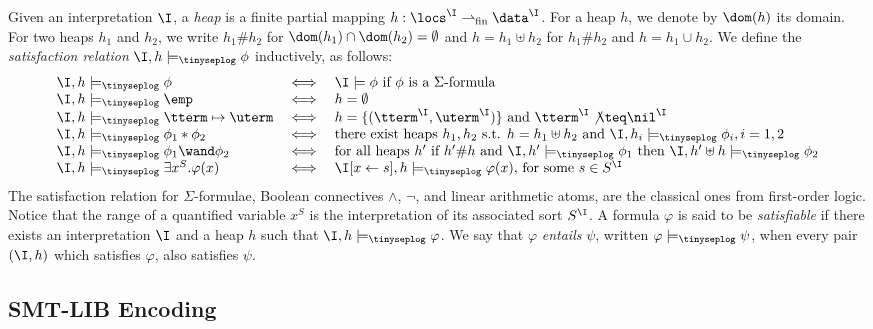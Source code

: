 \documentclass[10pt]{llncs}
\begin{document}
Given an interpretation $\I$, a \emph{heap} is a finite partial
mapping $h : \locs^\I \rightharpoonup_{\mathrm{fin}} \data^\I$. For a
heap $h$, we denote by $\dom(h)$ its domain. For two heaps $h_1$ and
$h_2$, we write $h_1 \# h_2$ for $\dom(h_1) \cap \dom(h_2) =
\emptyset$ and $h = h_1 \uplus h_2$ for $h_1 \# h_2$ and $h = h_1 \cup
h_2$. We define the \emph{satisfaction relation} $\I,h
\models_{\tinyseplog} \phi$ inductively, as follows:
\[\begin{array}{lcl}
\I,h \models_{\tinyseplog} \phi & \iff & \I \models \phi \text{ if $\phi$ is a $\Sigma$-formula} \\
\I,h \models_{\tinyseplog} \emp & \iff & h = \emptyset \\
\I,h \models_{\tinyseplog} \tterm \mapsto \uterm & \iff & 
h = \{(\tterm^\I,\uterm^\I)\} \text{ and } \tterm^\I\not\teq\nil^\I \\
\I,h \models_{\tinyseplog} \phi_1 * \phi_2 & \iff & \text{there exist heaps } h_1,h_2 
\text{ s.t. } h=h_1\uplus h_2 
\text{ and } \I,h_i \models_{\tinyseplog} \phi_i, i = 1,2 \\
\I,h \models_{\tinyseplog} \phi_1 \wand \phi_2 & \iff & \text{for all heaps } h' \text{ if } h'\#h 
\text{ and } \I,h' \models_{\tinyseplog} \phi_1
\text{ then } \I,h'\uplus h \models_{\tinyseplog} \phi_2 \\
\I,h \models_{\tinyseplog} \exists x^S . \varphi(x) & \iff & 
\I[x \leftarrow s],h \models_{\tinyseplog} \varphi(x) \text{, for some }s \in S^\I
\end{array}\]
The satisfaction relation for $\Sigma$-formulae, Boolean connectives
$\wedge$, $\neg$, and linear arithmetic atoms, are the classical ones
from first-order logic. Notice that the range of a quantified variable
$x^S$ is the interpretation of its associated sort $S^\I$. A formula
$\varphi$ is said to be \emph{satisfiable} if there exists an
interpretation $\I$ and a heap $h$ such that $\I,h
\models_{\tinyseplog} \varphi$. We say that $\varphi$ \emph{entails}
$\psi$, written $\varphi \models_{\tinyseplog} \psi$, when every pair
$(\I,h)$ which satisfies $\varphi$, also satisfies $\psi$.

\subsection{SMT-LIB Encoding}
\end{document}
